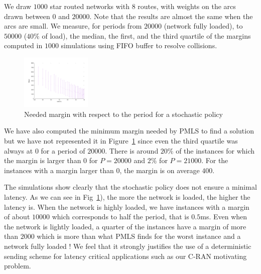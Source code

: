 \documentclass[10pt, conference, letterpaper]{IEEEtran}
\begin{document}
     
     We draw $1000$ star routed networks with $8$ routes, with weights on the arcs drawn between $0$ and $20000$. Note that the results are almost the same when the arcs are small. We measure, for periods from $20000$ (network fully loaded), to $50000$ ($40 \%$ of load), the median, the first, and the third quartile of the margins computed in $1000$ simulations using FIFO buffer to resolve collisions.
     
      
    \begin{figure}

       \begin{center}
     \hspace{-0.5cm} \includegraphics[width = 0.3\textwidth]{stochastic.pdf}
      \end{center}
      \vspace{-1cm}
      \caption{Needed margin with respect to the period for a stochastic policy}
      \label{fig:sto}
     \end{figure}    
     
     We have also computed the minimum margin needed by PMLS to find a solution but we have not represented it in Figure~\ref{fig:sto} since even the third quartile was always at $0$ for a period of $20000$.
     There is around $20\%$ of the instances for which the margin is larger than $0$ for $P=20000$ and $2\%$
     for $P = 21000$. For the instances with a margin larger than $0$, the margin is on average $400$.
     
     The simulations show clearly that the stochastic policy does not ensure a minimal latency. As we can see in Fig~\ref{fig:sto}), the more the network is loaded, the higher the latency is. When the network is highly loaded,
     we have instances with a margin of about $10000$ which corresponds to half the period, that is $0.5$ms. 
     Even when the network is lightly loaded, a quarter of the instances have a margin of more than $2000$
     which is more than what PMLS finds for the worst instance and a network fully loaded ! 
     We feel that it strongly justifies the use of a deterministic sending scheme for latency critical applications such as our C-RAN motivating problem.
     
\end{document}
